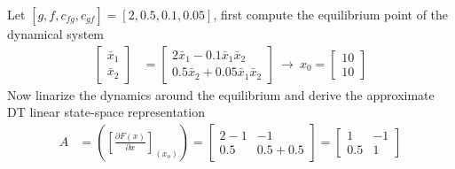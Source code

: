 \documentclass[twoside]{article}
\begin{document}
Let $[g , f , c_{fg} , c_{gf}] = [2 , 0.5 , 0.1 , 0.05]$, first compute the
equilibrium point of the dynamical system
%
\begin{align*}
	\left[ \begin{array}{c} \bar{x}_{1} \\ \bar{x}_{2} \end{array} \right]  &=
\left[ \begin{array}{c} 2 \bar{x}_1 - 0.1 \bar{x}_1 \bar{x}_2   \\ 
 0.5 \bar{x}_2 + 0.05 \bar{x}_1 \bar{x}_2  \end{array} \right] \
  \rightarrow \ x_0 = \left[ \begin{array}{c} 10 \\ 10 \end{array} \right] 
\end{align*}
%
Now linarize the dynamics around the equilibrium and derive the
approximate DT linear state-space representation
%
\begin{align*}
A &= \left( \left[ \frac{\partial F(x)}{\partial x}
                      \right]_{(x_o)} \right) =
    \left[ \begin{array}{cc} 2 - 1 & 
             - 1 \\ 
                          0.5 
           & 
             0.5 + 0.5
\end{array} \right]  =
                    \left[ \begin{array}{cc} 1 & -1 \\ 0.5 & 1 \end{array}  \right]
\end{align*}
\end{document}
